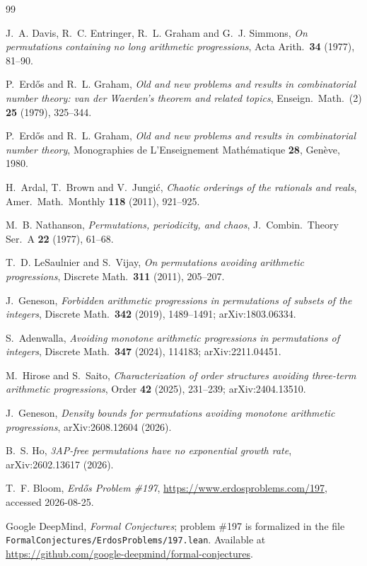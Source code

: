 \documentclass[11pt]{article}
\theoremstyle{definition}
\begin{document}
\begin{thebibliography}{99}

 J.~A. Davis, R.~C. Entringer, R.~L. Graham and
G.~J. Simmons, \emph{On permutations containing no long arithmetic
progressions}, Acta Arith.\ \textbf{34} (1977), 81--90.

 P.~Erd\H{o}s and R.~L. Graham, \emph{Old and new problems
and results in combinatorial number theory: van der Waerden's theorem and
related topics}, Enseign.\ Math.\ (2) \textbf{25} (1979), 325--344.

 P.~Erd\H{o}s and R.~L. Graham, \emph{Old and new problems
and results in combinatorial number theory}, Monographies de
L'Enseignement Math\'ematique \textbf{28}, Gen\`eve, 1980.

 H.~Ardal, T.~Brown and V.~Jungi\'c, \emph{Chaotic orderings
of the rationals and reals}, Amer.\ Math.\ Monthly \textbf{118} (2011),
921--925.

 M.~B. Nathanson, \emph{Permutations, periodicity, and
chaos}, J.\ Combin.\ Theory Ser.\ A \textbf{22} (1977), 61--68.

 T.~D. LeSaulnier and S.~Vijay, \emph{On permutations avoiding
arithmetic progressions}, Discrete Math.\ \textbf{311} (2011), 205--207.

 J.~Geneson, \emph{Forbidden arithmetic progressions in
permutations of subsets of the integers}, Discrete Math.\ \textbf{342}
(2019), 1489--1491; arXiv:1803.06334.

 S.~Adenwalla, \emph{Avoiding monotone arithmetic progressions
in permutations of integers}, Discrete Math.\ \textbf{347} (2024), 114183;
arXiv:2211.04451.

 M.~Hirose and S.~Saito, \emph{Characterization of order
structures avoiding three-term arithmetic progressions}, Order \textbf{42}
(2025), 231--239; arXiv:2404.13510.

 J.~Geneson, \emph{Density bounds for permutations avoiding
monotone arithmetic progressions}, arXiv:2608.12604 (2026).

 B.~S. Ho, \emph{3AP-free permutations have no exponential
growth rate}, arXiv:2602.13617 (2026).

 T.~F. Bloom, \emph{Erd\H{o}s Problem \#197},
\url{https://www.erdosproblems.com/197}, accessed 2026-08-25.

 Google DeepMind, \emph{Formal Conjectures}; problem \#197 is
formalized in the file
\texttt{FormalConjectures/ErdosProblems/197.lean}. Available at
\url{https://github.com/google-deepmind/formal-conjectures}.

\end{thebibliography}
\end{document}
